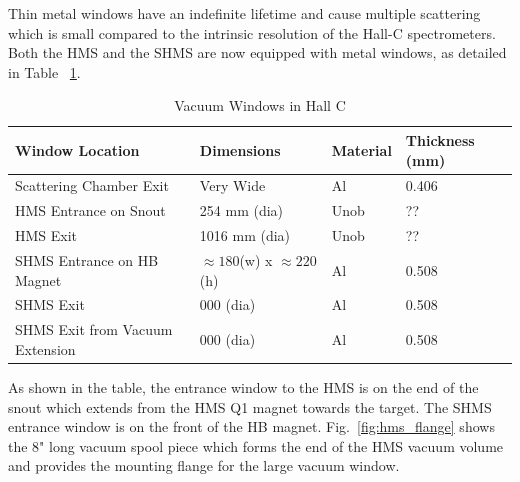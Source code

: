 {Thin metal windows have an indefinite lifetime and cause
multiple scattering which is small compared to the intrinsic resolution of
the Hall-C spectrometers. Both the HMS and the SHMS are now equipped
with metal windows, as detailed in Table ~\ref{tab:hall_c_windows_specs}.

\begin{table}
\begin{center}
\caption{Vacuum Windows in Hall C\label{tab:hall_c_windows_specs}}
\vspace{\baselineskip}
\begin{tabular}{|l|l|l|l|} 
\hline
Window Location				& Dimensions 	 	& Material & Thickness (mm) \\ \hline
Scattering Chamber Exit			& Very Wide		& Al		& 0.406\\
HMS Entrance	on Snout			& 254 mm (dia)		& Unob	& ??\\
HMS Exit						& 1016 mm (dia)	& Unob	& ??\\
SHMS Entrance on HB Magnet		& $\approx 180$(w) x $\approx 220$(h)		& Al	& 0.508\\
SHMS Exit					& 000 (dia)		& Al		& 0.508\\
SHMS Exit from Vacuum Extension	& 000 (dia)		& Al	& 0.508\\
\hline
\end{tabular}
\end{center}
\end{table}

As shown in the table, the entrance window to the HMS is on the end of the 
snout which extends from the HMS Q1 magnet towards the target. The SHMS
entrance window is on the front of the HB magnet. Fig.~\ref{fig:hms_flange} shows
the 8" long vacuum spool piece which forms the end of the HMS vacuum
volume and provides the mounting flange for the large vacuum window. 



}
